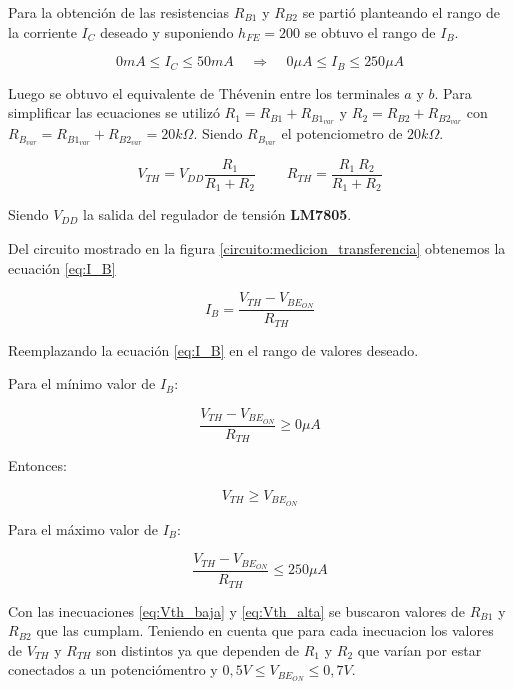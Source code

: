 \documentclass[10pt,spanish,a4paper,openany,notitlepage]{article}
\begin{document}
Para la obtención de las resistencias $R_{B1}$ y $R_{B2}$ se partió planteando el rango de la corriente $I_C$ deseado y suponiendo $h_{FE} = 200$ se obtuvo el rango de $I_B$.

\[ \displaystyle 0 \unit{mA} \leq I_C \leq 50\unit{mA} \ \ \ \ \ \Longrightarrow \ \ \ \ \  0 \unit{\mu A} \leq I_B \leq 250 \unit{\mu A} \]

Luego se obtuvo el equivalente de Thévenin entre los terminales $a$ y $b$. Para simplificar las ecuaciones se utilizó $R_1 = R_{B1} + R_{B1_{var}}$ y $R_2 = R_{B2} + R_{B2_{var}}$ con $R_{B_{var}} = R_{B1_{var}} + R_{B2_{var}} = 20 \unit{k\Omega}$. Siendo $R_{B_{var}}$ el potenciometro de $20 \unit{k\Omega}$.

\[ \displaystyle V_{TH} = V_{DD} \frac{R_1}{R_1 + R_2}\ \ \ \ \ \ \ \ \ \ R_{TH} = \frac{R_1\ R_2}{R_1 + R_2}\]

Siendo $V_{DD}$ la salida del regulador de tensión \textbf{LM7805}. 

Del circuito mostrado en la figura \ref{circuito:medicion_transferencia} obtenemos la ecuación \ref{eq:I_B}

\begin{equation}
\displaystyle I_B = \frac{V_{TH} - V_{BE_{ON}}}{R_{TH}}
\label{eq:I_B}
\end{equation}

Reemplazando la ecuación \ref{eq:I_B} en el rango de valores deseado.

Para el mínimo valor de $I_B$:

\[ \displaystyle \frac{V_{TH} - V_{BE_{ON}}}{R_{TH}} \geq 0 \unit{\mu A} \]

Entonces:

\begin{equation}
V_{TH} \geq V_{BE_{ON}}
\label{eq:Vth_baja}
\end{equation}

Para el máximo valor de $I_B$:

\begin{equation}
\frac{V_{TH} - V_{BE_{ON}}}{R_{TH}} \leq 250 \unit{\mu A}
\label{eq:Vth_alta}
\end{equation}

Con las inecuaciones \ref{eq:Vth_baja} y \ref{eq:Vth_alta} se buscaron valores de $R_{B1}$ y $R_{B2}$ que las cumplam. Teniendo en cuenta que para cada inecuacion los valores de $V_{TH}$ y $R_{TH}$ son distintos ya que dependen de $R_1$ y $R_2$ que varían por estar conectados a un potenciómentro y $0,5 \unit{V} \leq V_{BE_{ON}} \leq 0,7 \unit{V}$.\\
\end{document}
